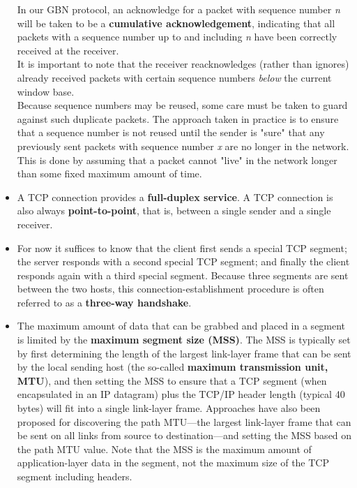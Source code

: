 \begin{itemize}
In our GBN protocol, an acknowledge for a packet with sequence number \textit{n} will be taken to be a \textbf{cumulative acknowledgement}, indicating that all packets with a sequence number up to and including \textit{n} have been correctly received at the receiver.\\
It is important to note that the receiver reacknowledges (rather than ignores) already received packets with certain sequence numbers \textit{below} the current window base.\\
Because sequence numbers may be reused, some care must be taken to guard against such duplicate packets. The approach taken in practice is to ensure that a sequence number is not reused until the sender is "sure" that any previously sent packets with sequence number \textit{x} are no longer in the network. This is done by assuming that a packet cannot "live" in the network longer than some fixed maximum amount of time.

\item
A TCP connection provides a \textbf{full-duplex service}. A TCP connection is also always \textbf{point-to-point}, that is, between a single sender and a single receiver.

\item
For now it suffices to know that the client first sends a special TCP segment; the server responds with a second special TCP segment; and finally the client responds again with a third special segment. Because three segments are sent between the two hosts, this connection-establishment procedure is often referred to as a \textbf{three-way handshake}.

\item
The maximum amount of data that can be grabbed and placed in a segment is limited by the \textbf{maximum segment size (MSS)}. The MSS is typically set by first determining the length of the largest link-layer frame that can be sent by the local sending host (the so-called \textbf{maximum transmission unit, MTU}), and then setting the MSS to ensure that a TCP segment (when encapsulated in an IP datagram) plus the TCP/IP header length (typical 40 bytes) will fit into a single link-layer frame. Approaches have also been proposed for discovering the path MTU---the largest link-layer frame that can be sent on all links from source to destination---and setting the MSS based on the path MTU value. Note that the MSS is the maximum amount of application-layer data in the segment, not the maximum size of the TCP segment including headers.


\end{itemize}

